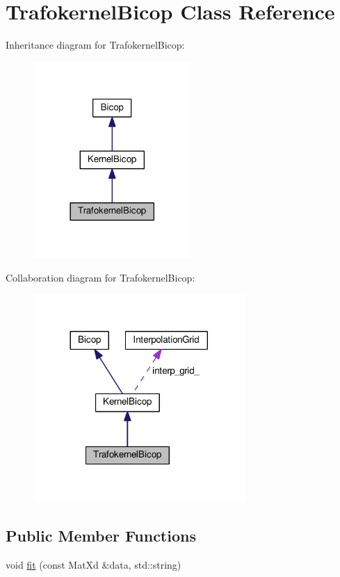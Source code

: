 \hypertarget{class_trafokernel_bicop}{}\section{Trafokernel\+Bicop Class Reference}
\label{class_trafokernel_bicop}


Inheritance diagram for Trafokernel\+Bicop\+:\nopagebreak
\begin{figure}[H]
\begin{center}
\leavevmode
\includegraphics[width=170pt]{class_trafokernel_bicop__inherit__graph}
\end{center}
\end{figure}


Collaboration diagram for Trafokernel\+Bicop\+:\nopagebreak
\begin{figure}[H]
\begin{center}
\leavevmode
\includegraphics[width=228pt]{class_trafokernel_bicop__coll__graph}
\end{center}
\end{figure}
\subsection*{Public Member Functions}
\begin{DoxyCompactItemize}
\item 
void \hyperlink{class_trafokernel_bicop_ae5da9284cd058b02878614059d8ce078}{fit} (const Mat\+Xd \&data, std\+::string)
\end{DoxyCompactItemize}
